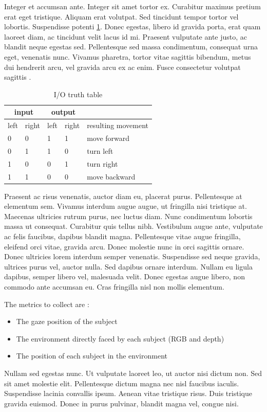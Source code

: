 Integer et accumsan ante. Integer sit amet tortor ex. Curabitur maximus pretium erat eget tristique. Aliquam erat volutpat. Sed tincidunt tempor tortor vel lobortis. Suspendisse potenti \ref{tab:truthtable}. Donec egestas, libero id gravida porta, erat quam laoreet diam, ac tincidunt velit lacus id mi. Praesent vulputate ante justo, ac blandit neque egestas sed. Pellentesque sed massa condimentum, consequat urna eget, venenatis nunc. Vivamus pharetra, tortor vitae sagittis bibendum, metus dui hendrerit arcu, vel gravida arcu ex ac enim. Fusce consectetur volutpat sagittis \cite{goldberg1988genetic}.

\begin{table}[ht]
    \centering
    \begin{tabular}{|l|l|l|l|l|} 
        \hline
        \multicolumn{2}{|c|}{input} & \multicolumn{2}{c|}{output} & \\
        \hline
        left & right & left & right & resulting movement\\ \hline
        0 & 0 & 1 & 1 & move forward\\ \hline
        0 & 1 & 1 & 0 & turn left\\ \hline
        1 & 0 & 0 & 1 & turn right\\ \hline
        1 & 1 & 0 & 0 & move backward\\ \hline
    \end{tabular}
    \caption{I/O truth table}
    \label{tab:truthtable}
\end{table}

Praesent ac risus venenatis, auctor diam eu, placerat purus. Pellentesque at elementum sem. Vivamus interdum augue augue, ut fringilla nisi tristique at. Maecenas ultricies rutrum purus, nec luctus diam. Nunc condimentum lobortis massa ut consequat. Curabitur quis tellus nibh. Vestibulum augue ante, vulputate ac felis faucibus, dapibus blandit magna. Pellentesque vitae augue fringilla, eleifend orci vitae, gravida arcu. Donec molestie nunc in orci sagittis ornare. Donec ultricies lorem interdum semper venenatis. Suspendisse sed neque gravida, ultrices purus vel, auctor nulla. Sed dapibus ornare interdum. Nullam eu ligula dapibus, semper libero vel, malesuada velit. Donec egestas augue libero, non commodo ante accumsan eu. Cras fringilla nisl non mollis elementum.

The metrics to collect are :
\begin{itemize}
    \item The gaze position of the subject
    \item The environment directly faced by each subject (RGB and depth)
    \item The position of each subject in the environment
\end{itemize}

Nullam sed egestas nunc. Ut vulputate laoreet leo, ut auctor nisi dictum non. Sed sit amet molestie elit. Pellentesque dictum magna nec nisl faucibus iaculis. Suspendisse lacinia convallis ipsum. Aenean vitae tristique risus. Duis tristique gravida euismod. Donec in purus pulvinar, blandit magna vel, congue nisi.